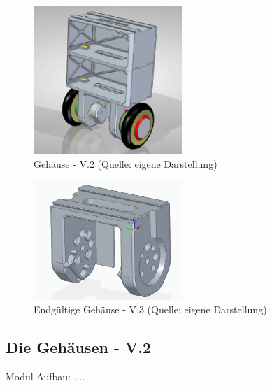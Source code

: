 \begin{figure}[!h]  %
	\centering\includegraphics[width=0.5\textwidth]{images/gehaeuse-v2.png}
	\caption{Gehäuse - V.2 \newline (Quelle: eigene Darstellung)}
	\label{gehaeuse-v2} %
\end{figure}
\begin{figure}[!h]  %
	\centering\includegraphics[width=0.5\textwidth]{images/MH.png}
	\caption{Endgültige Gehäuse - V.3 \newline (Quelle: eigene Darstellung)}
	\label{MH} %
\end{figure}

\subsection{Die Gehäusen - V.2}
Modul Aufbau: ....

